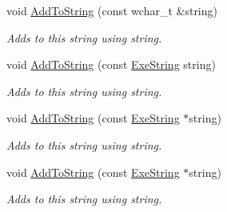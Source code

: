\begin{DoxyCompactItemize}
void \hyperlink{class_triton_1_1_util_1_1_exe_string_a616caba376e25fe342df95d9763457cc}{Add\+To\+String} (const wchar\+\_\+t \&string)
\begin{DoxyCompactList}\small\item\em Adds to this string using string. \end{DoxyCompactList}\item 
void \hyperlink{class_triton_1_1_util_1_1_exe_string_a01fafa390c4e5f555118728922cc2f89}{Add\+To\+String} (const \hyperlink{class_triton_1_1_util_1_1_exe_string}{Exe\+String} string)
\begin{DoxyCompactList}\small\item\em Adds to this string using string. \end{DoxyCompactList}\item 
void \hyperlink{class_triton_1_1_util_1_1_exe_string_a316bfd73e44d7dbfb700744e83870dbe}{Add\+To\+String} (const \hyperlink{class_triton_1_1_util_1_1_exe_string}{Exe\+String} $\ast$string)
\begin{DoxyCompactList}\small\item\em Adds to this string using string. \end{DoxyCompactList}\item 
void \hyperlink{class_triton_1_1_util_1_1_exe_string_a316bfd73e44d7dbfb700744e83870dbe}{Add\+To\+String} (const \hyperlink{class_triton_1_1_util_1_1_exe_string}{Exe\+String} $\ast$string)
\begin{DoxyCompactList}\small\item\em Adds to this string using string. \end{DoxyCompactList}\end{DoxyCompactItemize}
